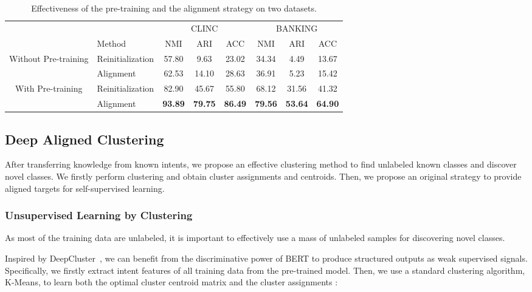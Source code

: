 \documentclass[letterpaper]{article} \usepackage{aaai21}  \usepackage{times}  \usepackage{helvet} \usepackage{courier}  \usepackage[hyphens]{url}  \usepackage{graphicx} \urlstyle{rm} \def\UrlFont{\rm}  \usepackage{natbib}  \usepackage{caption} \frenchspacing  \setlength{\pdfpagewidth}{8.5in}  \setlength{\pdfpageheight}{11in}  \usepackage{amsmath}
\begin{document}
	\begin{table*}[t!]\small
		\centering
		\begin{tabular}{@{\extracolsep{4pt}}clcccccc}
			\toprule
			\centering
			&  & \multicolumn{3}{c}{CLINC} & \multicolumn{3}{c}{BANKING}\\
			\addlinespace[0.1cm] \cline{3-5} \cline{6-8} \addlinespace[0.1cm]
			& Method & NMI & ARI & ACC & NMI & ARI & ACC \\
			\midrule
			\multirow{2}{*}{Without Pre-training} 
			& Reinitialization  & 57.80 & 9.63 & 23.02 & 34.34 & 4.49 & 13.67\\
			& Alignment & 62.53 & 14.10 & 28.63 & 36.91 & 5.23 & 15.42\\
			\midrule
			\multirow{2}{*}{With Pre-training} 
			& Reinitialization  & 82.90 & 45.67 & 55.80 & 68.12 & 31.56 & 41.32\\
			& Alignment  & \textbf{93.89} & \textbf{79.75} & \textbf{86.49} & \textbf{79.56} & \textbf{53.64} & \textbf{64.90}\\
			\bottomrule
		\end{tabular}
		\caption{ \label{results-aba-1}  
			Effectiveness of the pre-training  and the alignment strategy on two datasets. 
		}
	\end{table*}
	
	\subsection{Deep Aligned Clustering}
	After transferring knowledge from known intents, we propose an effective clustering method to find unlabeled known classes and discover novel classes. We firstly perform clustering and obtain cluster assignments and centroids. Then, we propose an original strategy to provide aligned targets for self-supervised learning.
	
	\subsubsection{Unsupervised Learning by Clustering}
	As most of the training data are unlabeled, it is important to effectively use a mass of unlabeled samples for discovering novel classes.
	
	Inspired by DeepCluster~\cite{caron2018deep}, we can benefit from the discriminative power of BERT to produce structured outputs as weak supervised signals. Specifically, we firstly extract intent features of all training data from the pre-trained model. Then, we use a standard clustering algorithm, K-Means, to learn both the optimal cluster centroid matrix  and the cluster assignments :
	
\end{document}
